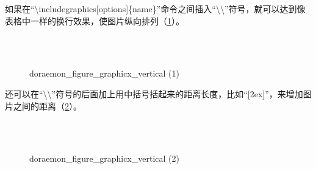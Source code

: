 \documentclass{article}
\begin{document}
    如果在``\textbackslash includegraphics[options]\{name\}''命令之间插入``\textbackslash\textbackslash''符号，就可以达到像表格中一样的换行效果，使图片纵向排列（\ref{4}）。

    \begin{figure}[htbp]
        \centering
        \\
        \\
        \caption{doraemon\_figure\_graphicx\_vertical (1)}
        \label{4}
    \end{figure}

    还可以在``\textbackslash\textbackslash''符号的后面加上用中括号括起来的距离长度，比如``[2ex]''，来增加图片之间的距离（\ref{5}）。

    \begin{figure}[htbp]
        \centering
        \\[2ex]
        \\[2ex]
        \caption{doraemon\_figure\_graphicx\_vertical (2)}
        \label{5}
    \end{figure}
\end{document}
